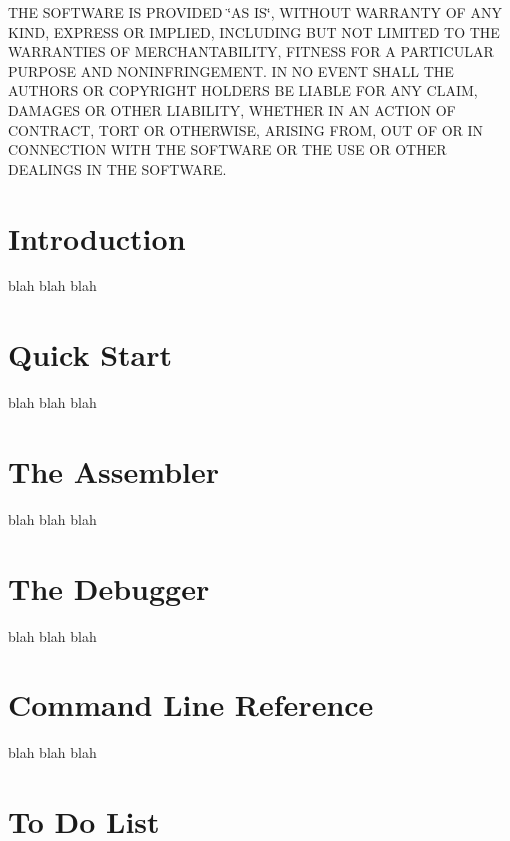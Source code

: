 T\-H\-E S\-O\-F\-T\-W\-A\-R\-E I\-S P\-R\-O\-V\-I\-D\-E\-D \char`\"{}\-A\-S I\-S\char`\"{}, W\-I\-T\-H\-O\-U\-T W\-A\-R\-R\-A\-N\-T\-Y O\-F A\-N\-Y K\-I\-N\-D, E\-X\-P\-R\-E\-S\-S O\-R I\-M\-P\-L\-I\-E\-D, I\-N\-C\-L\-U\-D\-I\-N\-G B\-U\-T N\-O\-T L\-I\-M\-I\-T\-E\-D T\-O T\-H\-E W\-A\-R\-R\-A\-N\-T\-I\-E\-S O\-F M\-E\-R\-C\-H\-A\-N\-T\-A\-B\-I\-L\-I\-T\-Y, F\-I\-T\-N\-E\-S\-S F\-O\-R A P\-A\-R\-T\-I\-C\-U\-L\-A\-R P\-U\-R\-P\-O\-S\-E A\-N\-D N\-O\-N\-I\-N\-F\-R\-I\-N\-G\-E\-M\-E\-N\-T. I\-N N\-O E\-V\-E\-N\-T S\-H\-A\-L\-L T\-H\-E A\-U\-T\-H\-O\-R\-S O\-R C\-O\-P\-Y\-R\-I\-G\-H\-T H\-O\-L\-D\-E\-R\-S B\-E L\-I\-A\-B\-L\-E F\-O\-R A\-N\-Y C\-L\-A\-I\-M, D\-A\-M\-A\-G\-E\-S O\-R O\-T\-H\-E\-R L\-I\-A\-B\-I\-L\-I\-T\-Y, W\-H\-E\-T\-H\-E\-R I\-N A\-N A\-C\-T\-I\-O\-N O\-F C\-O\-N\-T\-R\-A\-C\-T, T\-O\-R\-T O\-R O\-T\-H\-E\-R\-W\-I\-S\-E, A\-R\-I\-S\-I\-N\-G F\-R\-O\-M, O\-U\-T O\-F O\-R I\-N C\-O\-N\-N\-E\-C\-T\-I\-O\-N W\-I\-T\-H T\-H\-E S\-O\-F\-T\-W\-A\-R\-E O\-R T\-H\-E U\-S\-E O\-R O\-T\-H\-E\-R D\-E\-A\-L\-I\-N\-G\-S I\-N T\-H\-E S\-O\-F\-T\-W\-A\-R\-E.\hypertarget{index_intro_sec}{}\section{Introduction}\label{index_intro_sec}
blah blah blah\hypertarget{index_quickstart_sec}{}\section{Quick Start}\label{index_quickstart_sec}
blah blah blah\hypertarget{index_assembler_sec}{}\section{The Assembler}\label{index_assembler_sec}
blah blah blah\hypertarget{index_debugger_sec}{}\section{The Debugger}\label{index_debugger_sec}
blah blah blah\hypertarget{index_command_sec}{}\section{Command Line Reference}\label{index_command_sec}
blah blah blah\hypertarget{index_todo_sec}{}\section{To Do List}\label{index_todo_sec}

